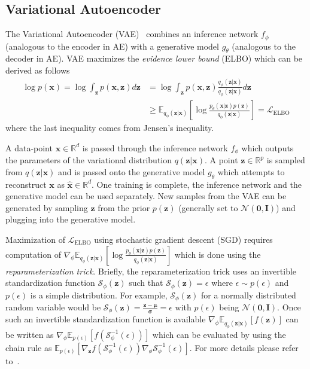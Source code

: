 \documentclass[runningheads]{llncs}
\begin{document}
\subsection{Variational Autoencoder}
The Variational Autoencoder (VAE)~\cite{kingma2013auto} combines an inference network $f_\phi$ (analogous to the encoder in AE) with a generative model $g_\theta$ (analogous to the decoder in AE). VAE maximizes the \textit{evidence lower bound} (ELBO) which can be derived as follows
\begin{align}
\log p(\mathbf{x}) = \log\int_{\mathbf{z}}p(\mathbf{x}, \mathbf{z})d\mathbf{z} &= \log\int_{\mathbf{z}}p(\mathbf{x}, \mathbf{z})\frac{q_\phi(\mathbf{z}|\mathbf{x})}{q_\phi(\mathbf{z}|\mathbf{x})}d\mathbf{z}\\
&\geq \mathbb{E}_{q_\phi(\mathbf{z}|\mathbf{x})}\left[\log\frac{p_\theta(\mathbf{x}| \mathbf{z})p(\mathbf{z})}{q_\phi(\mathbf{z}|\mathbf{x})}\right] = \mathcal{L}_{\mathrm{ELBO}}
\end{align}
where the last inequality comes from Jensen's inequality.

A data-point $\mathbf{x} \in \mathbb{R}^d$ is passed through the inference network $f_\phi$ which outputs the parameters of the variational distribution $q(\mathbf{z}|\mathbf{x})$. A point $\mathbf{z} \in \mathbb{R}^p$ is sampled from $q(\mathbf{z}|\mathbf{x})$ and is passed onto the generative model $g_\theta$ which attempts to reconstruct $\mathbf{x}$ as $\mathbf{\hat{x}} \in \mathbb{R}^d$. One training is complete, the inference network and the generative model can be used separately. New samples from the VAE can be generated by sampling $\mathbf{z}$ from the prior $p(\mathbf{z})$ (generally set to $\mathcal{N}(\bm{0}, \mathbf{I})$) and plugging into the generative model.

Maximization of $\mathcal{L}_{\mathrm{ELBO}}$ using stochastic gradient descent (SGD) requires computation of $\nabla_\phi \mathbb{E}_{q_\phi(\mathbf{z}|\mathbf{x})}\left[\log\frac{p_\theta(\mathbf{x}| \mathbf{z})p(\mathbf{z})}{q_\phi(\mathbf{z}|\mathbf{x})}\right]$ which is done using the \textit{reparameterization trick}. Briefly, the reparameterization trick uses an invertible standardization function $\mathcal{S}_{\phi}(\mathbf{z})$ such that $\mathcal{S}_{\phi}(\mathbf{z}) = \epsilon$ where $\epsilon \sim p(\epsilon)$ and $p(\epsilon)$ is a simple distribution. For example, $\mathcal{S}_{\phi}(\mathbf{z})$ for a normally distributed random variable would be $\mathcal{S}_{\phi}(\mathbf{z}) = \frac{\mathbf{z}-\bm{\mu}}{\bm{\sigma}} = \epsilon$ with $p(\epsilon)$ being $\mathcal{N}(\bm{0}, \mathbf{I})$. Once such an invertible standardization function is available $\nabla_\phi \mathbb{E}_{q_\phi(\mathbf{z}|\mathbf{x})}\left[f(\mathbf{z})\right]$ can be written as $\nabla_\phi \mathbb{E}_{p(\epsilon)}\left[f(\mathcal{S}_{\phi}^{-1}(\epsilon))\right]$ which can be evaluated by using the chain rule as $ \mathbb{E}_{p(\epsilon)}\left[\nabla_{\mathbf{z}}f(\mathcal{S}_{\phi}^{-1}(\epsilon))\nabla_\phi\mathcal{S}_{\phi}^{-1}(\epsilon)\right]$. For more details please refer to~\cite{figurnov2018implicit}.
\end{document}
